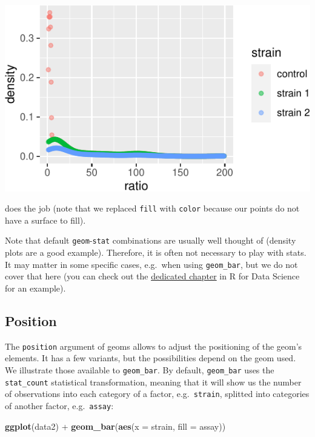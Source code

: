 \documentclass[]{book}
\newenvironment{Shaded}{}{}
\newcommand{\DataTypeTok}[1]{\textcolor[rgb]{0.56,0.13,0.00}{#1}}
\newcommand{\KeywordTok}[1]{\textcolor[rgb]{0.00,0.44,0.13}{\textbf{#1}}}
\newcommand{\NormalTok}[1]{#1}
\newcommand{\OperatorTok}[1]{\textcolor[rgb]{0.40,0.40,0.40}{#1}}
\newcommand{\StringTok}[1]{\textcolor[rgb]{0.25,0.44,0.63}{#1}}
\begin{document}
\begin{center}\includegraphics[width=\textwidth]{TRES-Tidy-Tutorial_files/figure-latex/unnamed-chunk-115-1} \end{center}

does the job (note that we replaced \texttt{fill} with \texttt{color} because our points do not have a surface to fill).

Note that default \texttt{geom}-\texttt{stat} combinations are usually well thought of (density plots are a good example). Therefore, it is often not necessary to play with stats. It may matter in some specific cases, e.g.~when using \texttt{geom\_bar}, but we do not cover that here (you can check out the \href{https://r4ds.had.co.nz/data-visualisation.html\#statistical-transformations}{dedicated chapter} in R for Data Science for an example).

\hypertarget{position}{%
\subsection{Position}\label{position}}

The \texttt{position} argument of geoms allows to adjust the positioning of the geom's elements. It has a few variants, but the possibilities depend on the geom used. We illustrate those available to \texttt{geom\_bar}. By default, \texttt{geom\_bar} uses the \texttt{stat\_count} statistical transformation, meaning that it will show us the number of observations into each category of a factor, e.g.~\texttt{strain}, splitted into categories of another factor, e.g.~\texttt{assay}:

\begin{Shaded}
\begin{Highlighting}[]
\KeywordTok{ggplot}\NormalTok{(data2) }\OperatorTok{+}
\StringTok{  }\KeywordTok{geom_bar}\NormalTok{(}\KeywordTok{aes}\NormalTok{(}\DataTypeTok{x =}\NormalTok{ strain, }\DataTypeTok{fill =}\NormalTok{ assay))}
\end{Highlighting}
\end{Shaded}
\end{document}

